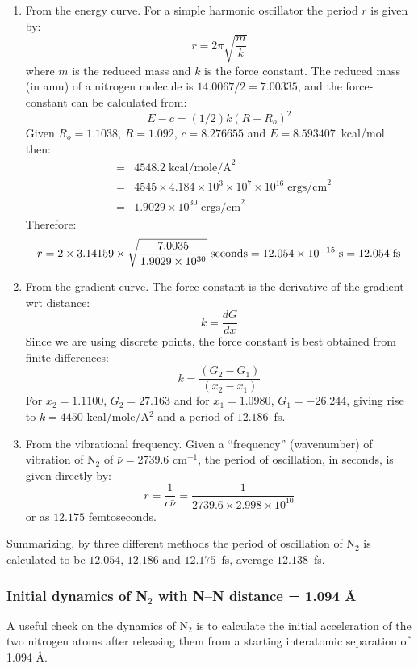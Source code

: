 \documentclass[a4paper]{book}
\newcommand{\mi}[1]{#1\index{#1}}
\begin{document}
\begin{enumerate}
\item From the energy curve.
For a simple harmonic oscillator the period $r$ is given by:
$$ r = 2 \pi \sqrt{\frac{m}{k}}  $$
where $m$ is the \mi{reduced mass} and $k$ is the \mi{force constant}. 
The  reduced  mass  (in amu)   of   a   nitrogen  molecule  is  
$14.0067/2  =  7.00335$,  and  the force-constant can be calculated from:
$$                 E-c = (1/2) k(R-R_o)^2 $$
Given $R_o = 1.1038$, $R = 1.092$, $c = 8.276655$ and $E = 8.593407$~kcal/mol
then:
\begin{eqnarray*}                      
& = & 4548.2 \; \mbox{kcal/mole/A}^2 \\
& = & 4545 \times 4.184 \times 10^3 \times 10^7 \times 10^{16}\; 
\mbox{ergs/cm}^2 \\
& = & 1.9029 \times 10^{30} \; \mbox{ergs/cm}^2
\end{eqnarray*}
Therefore:      
$$ r = 2 \times 3.14159 \times \sqrt{\frac{7.0035}{1.9029\times 10^{30}}}
\;{\rm seconds} = 12.054 \times 10^{-15}\;{\rm s} = 12.054\;{\rm fs} $$

\item From the gradient curve.
The force  constant  is  the  derivative  of  the  gradient  wrt
distance:
$$ k = \frac{dG}{dx} $$
Since we are using discrete points,  the  force  constant  is  best
obtained from finite differences:
$$ k = \frac{(G_2-G_1)}{(x_2-x_1)} $$
For $x_2 = 1.1100$, $G_2 = 27.163$ and for $x_1 =  1.0980$,  
$G_1  =  -26.244$,
giving rise to $k = 4450$ kcal/mole/A$^2$ and a period of $12.186$~fs.

\item From the vibrational frequency.
Given a ``frequency'' (wavenumber) of vibration of N$_2$ of $\bar{\nu}=2739.6$  
cm$^{-1}$,  the period of oscillation, in seconds, is given directly by:
$$ r = \frac{1}{c\bar{\nu}} = \frac{1}{2739.6 \times 2.998 \times 10^{10}} 
$$
or as $12.175$ femtoseconds.
\end{enumerate}

Summarizing, by three different methods the period  of  oscillation
of N$_2$  is calculated to be $12.054$, $12.186$ and $12.175$~fs, average
$12.138$~fs.

\subsubsection{Initial dynamics of N$_2$ with N--N distance = 1.094 \AA}

A useful check on the dynamics of N$_2$ is to  calculate  the  initial
acceleration  of  the  two  nitrogen  atoms  after releasing them from a
starting interatomic separation of 1.094 \AA.
\end{document}
